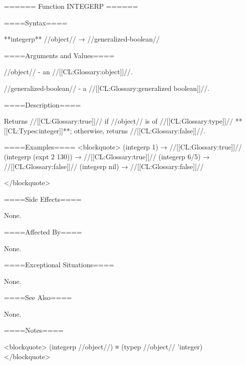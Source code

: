 ====== Function INTEGERP ======

====Syntax====

**integerp** //object// → //generalized-boolean//

====Arguments and Values====

//object// - an //[[CL:Glossary:object]]//.

//generalized-boolean// - a //[[CL:Glossary:generalized boolean]]//.

====Description====

Returns //[[CL:Glossary:true]]// if //object// is of //[[CL:Glossary:type]]// **[[CL:Types:integer]]**; otherwise, returns //[[CL:Glossary:false]]//.

====Examples==== <blockquote> (integerp 1) → //[[CL:Glossary:true]]// (integerp (expt 2 130)) → //[[CL:Glossary:true]]// (integerp 6/5) → //[[CL:Glossary:false]]// (integerp nil) → //[[CL:Glossary:false]]//

</blockquote>

====Side Effects====

None.

====Affected By====

None.

====Exceptional Situations====

None.

====See Also====

None.

====Notes====

<blockquote> (integerp //object//) ≡ (typep //object// 'integer) </blockquote>

